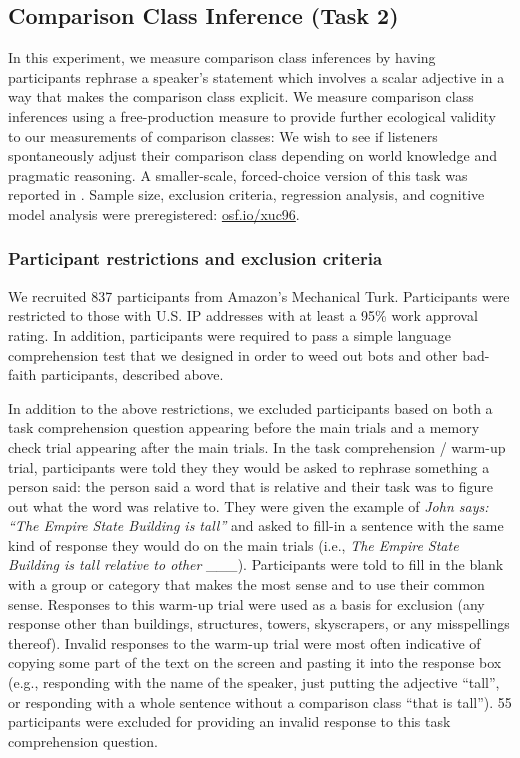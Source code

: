 \documentclass[doc]{apa6}
\begin{document}
\subsection{Comparison Class Inference (Task 2)}

In this experiment, we measure comparison class inferences by having participants rephrase a speaker's statement which involves a scalar adjective in a way that makes the comparison class explicit.
We measure comparison class inferences using a free-production measure to provide further ecological validity to our measurements of comparison classes: We wish to see if listeners spontaneously adjust their comparison class depending on world knowledge and pragmatic reasoning.
A smaller-scale, forced-choice version of this task was reported in .  
Sample size, exclusion criteria, regression analysis, and cognitive model analysis were preregistered: \url{osf.io/xuc96}.

\subsubsection{Participant restrictions and exclusion criteria}

We recruited 837 participants from Amazon's Mechanical Turk. 
Participants were restricted to those with U.S. IP addresses with at least a 95\% work approval rating. 
In addition, participants were required to pass a simple language comprehension test that we designed in order to weed out bots and other bad-faith participants, described above.

In addition to the above restrictions, we excluded participants based on both a task comprehension question appearing before the main trials and a memory check trial appearing after the main trials. 
In the task comprehension / warm-up trial, participants were told they they would be asked to rephrase something a person said:  the person said a word that is relative and their task was to figure out what the word was relative to. They were given the example of \emph{John says: ``The Empire State Building is tall''} and asked to fill-in a sentence with the same kind of response they would do on the main trials (i.e., \emph{The Empire State Building is tall relative to other \_\_\_}). Participants were told to fill in the blank with a group or category that makes the most sense and to use their common sense.
Responses to this warm-up trial were used as a basis for exclusion (any response other than buildings, structures, towers, skyscrapers, or any misspellings thereof). 
Invalid responses to the warm-up trial were most often indicative of copying some part of the text on the screen and pasting it into the response box (e.g., responding with the name of the speaker, just putting the adjective ``tall'', or responding with a whole sentence without a comparison class ``that is tall'').
55 participants were excluded for providing an invalid response to this task comprehension question. 
\end{document}
